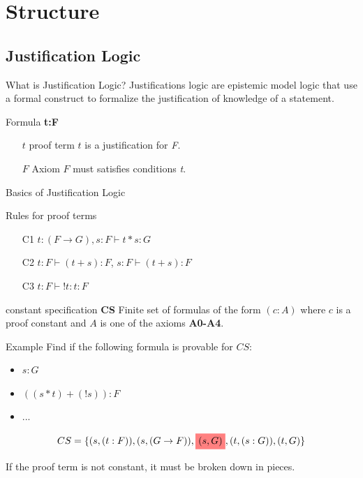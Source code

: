 \documentclass{beamer}
\newcommand{\highlight}[1]{%
  \colorbox{red!50}{$\displaystyle#1$}}
\begin{document}
\section{Structure}
\subsection{Justification Logic}
\begin{frame}{What is Justification Logic?}
	 Justifications logic are epistemic model logic that use a formal construct to formalize the justification of knowledge of a statement.
	\begin{block}{Formula \textbf{t:F}}
	\begin{itemize}
		\item[$t$] proof term $t$ is a justification for \textit{F}.
		\item[$F$] Axiom $F$ must satisfies conditions \textit{t}.
	\end{itemize}
	\end{block}	
\end{frame}

\begin{frame}{Basics of Justification Logic}
	\begin{block}{Rules for proof terms}
	\begin{itemize}
	\item[C1]$t:(F \to G), s:F \vdash t*s:G$
	\item[C2]$t:F \vdash (t+s):F$, $s:F \vdash (t+s):F$
	\item[C3]$t:F \vdash !t:t:F$
	\end{itemize}
	\end{block}
	\begin{block}{constant specification \textbf{CS}}
	Finite set of formulas of the form $(c:A)$ where $c$ is a proof constant and $A$ is one of the axioms \textbf{A0-A4}.
	\end{block}
\end{frame}

\begin{frame}{Example}
		Find if the following formula is provable for $CS$:
		\begin{itemize}
		\item $s:G$
		\item $((s*t)+(!s)):F$
		\item $...$
		\end{itemize}
		
		\begin{equation}
		CS = \{(s, (t:F)), (s, (G \to F)), \highlight{(s, G)}, (t, (s:G)), (t, G)\}		
		\end{equation}

		If the proof term is not constant, it must be broken down in pieces.
\end{frame}
\end{document}
